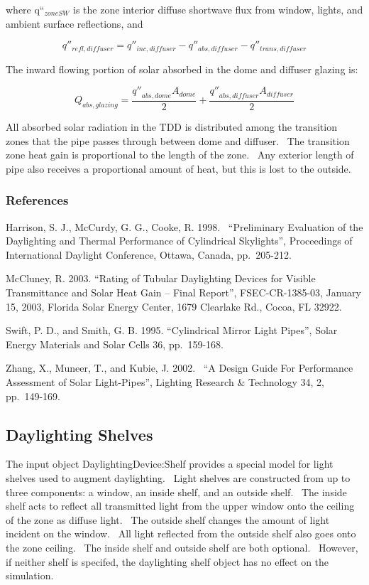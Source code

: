 where q``\(_{zoneSW}\) is the zone interior diffuse shortwave flux from window, lights, and ambient surface reflections, and

\begin{equation}
{q''_{refl,diffuser}} = {q''_{inc,diffuser}} - {q''_{abs,diffuser}} - {q''_{trans,diffuser}}
\end{equation}

The inward flowing portion of solar absorbed in the dome and diffuser glazing is:

\begin{equation}
{Q_{abs,glazing}} = \frac{{{{q''}_{abs,dome}}{A_{dome}}}}{2} + \frac{{{{q''}_{abs,diffuser}}{A_{diffuser}}}}{2}
\end{equation}

All absorbed solar radiation in the TDD is distributed among the transition zones that the pipe passes through between dome and diffuser.~ The transition zone heat gain is proportional to the length of the zone.~ Any exterior length of pipe also receives a proportional amount of heat, but this is lost to the outside.

\subsubsection{References}\label{references-016}

Harrison, S. J., McCurdy, G. G., Cooke, R. 1998.~ ``Preliminary Evaluation of the Daylighting and Thermal Performance of Cylindrical Skylights'', Proceedings of International Daylight Conference, Ottawa, Canada, pp.~205-212.

McCluney, R. 2003. ``Rating of Tubular Daylighting Devices for Visible Transmittance and Solar Heat Gain -- Final Report'', FSEC-CR-1385-03, January 15, 2003, Florida Solar Energy Center, 1679 Clearlake Rd., Cocoa, FL 32922.

Swift, P. D., and Smith, G. B. 1995. ``Cylindrical Mirror Light Pipes'', Solar Energy Materials and Solar Cells 36, pp.~159-168.

Zhang, X., Muneer, T., and Kubie, J. 2002.~ ``A Design Guide For Performance Assessment of Solar Light-Pipes'', Lighting Research \& Technology 34, 2, pp.~149-169.

\subsection{Daylighting Shelves}\label{daylighting-shelves}

The input object DaylightingDevice:Shelf provides a special model for light shelves used to augment daylighting.~ Light shelves are constructed from up to three components: a window, an inside shelf, and an outside shelf.~ The inside shelf acts to reflect all transmitted light from the upper window onto the ceiling of the zone as diffuse light.~ The outside shelf changes the amount of light incident on the window.~ All light reflected from the outside shelf also goes onto the zone ceiling.~ The inside shelf and outside shelf are both optional.~ However, if neither shelf is specifed, the daylighting shelf object has no effect on the simulation.

